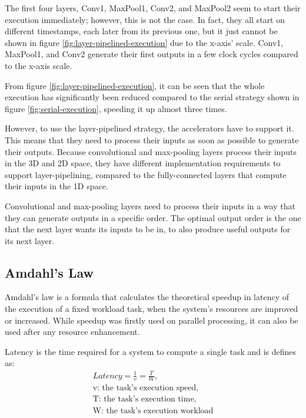 The first four layers, Conv1, MaxPool1, Conv2, and MaxPool2 seem to start their execution immediately; however, this is not the case. In fact, they all start on different timestamps, each later from its previous one, but it just cannot be shown in figure \ref{fig:layer-pipelined-execution} due to the x-axis' scale. Conv1, MaxPool1, and Conv2 generate their first outputs in a few clock cycles compared to the x-axis scale.

From figure \ref{fig:layer-pipelined-execution}, it can be seen that the whole execution has significantly been reduced compared to the serial strategy shown in figure \ref{fig:serial-execution}, speeding it up almost three times.

However, to use the layer-pipelined strategy, the accelerators have to support it. This means that they need to process their inputs as soon as possible to generate their outputs. Because convolutional and max-pooling layers process their inputs in the 3D and 2D space, they have different implementation requirements to support layer-pipelining, compared to the fully-connected layers that compute their inputs in the 1D space.

Convolutional and max-pooling layers need to process their inputs in a way that they can generate outputs in a specific order. The optimal output order is the one that the next layer wants its inputs to be in, to also produce useful outputs for its next layer.

\subsection{Amdahl's Law}
\label{sec:Amdahls-Law}
Amdahl's law \cite{Improvements-in-Multiprocessor-System-Design} is a formula that calculates the theoretical speedup in latency of the execution of a fixed workload task, when the system's resources are improved or increased. While speedup was firstly used on parallel processing, it can also be used after any resource enhancement.

Latency is the time required for a system to compute a single task and is defines as:
\begin{equation}
	\label{eqn:latency}
	\begin{split}
		Latency = \frac{1}{v} = \frac{T}{W},\\
		\mbox{v: the task's execution speed},\\
		\mbox{T: the task's execution time},\\
		\mbox{W: the task's execution workload}\\
	\end{split}
\end{equation}

